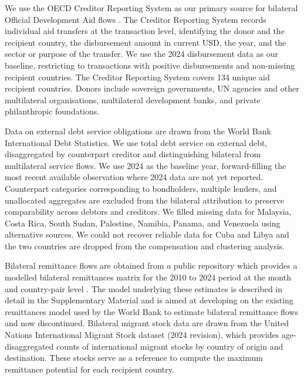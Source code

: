 \documentclass[fleqn,10pt,twocolumn]{wlscirep}
\begin{document}

We use the OECD Creditor Reporting System as our primary source for bilateral Official Development Aid flows \cite{CRS_ODA_2024}. The Creditor Reporting System records individual aid transfers at the transaction level, identifying the donor and the recipient country, the disbursement amount in current USD, the year, and the sector or purpose of the transfer. We use the 2024 disbursement data as our baseline, restricting to transactions with positive disbursements and non-missing recipient countries. The Creditor Reporting System covers 134 unique aid recipient countries. Donors include sovereign governments, UN agencies and other multilateral organisations, multilateral development banks, and private philanthropic foundations. 

Data on external debt service obligations are drawn from the World Bank International Debt Statistics. We use total debt service on external debt, disaggregated by counterpart creditor and distinguishing bilateral from multilateral service flows. We use 2024 as the baseline year, forward-filling the most recent available observation where 2024 data are not yet reported. Counterpart categories corresponding to bondholders, multiple lenders, and unallocated aggregates are excluded from the bilateral attribution to preserve comparability across debtors and creditors. We filled missing data for Malaysia, Costa Rica, South Sudan, Palestine, Namibia, Panama, and Venezuela using alternative sources. We could not recover reliable data for Cuba and Libya and the two countries are dropped from the compensation and clustering analysis.

Bilateral remittance flows are obtained from a public repository which provides a modelled bilateral remittances matrix for the 2010 to 2024 period at the month and country-pair level \cite{vismara2025migrants}. The model underlying these estimates is described in detail in the Supplementary Material and is aimed at developing on the existing remittances model used by the World Bank to estimate bilateral remittance flows \cite{ratha2007south} and now discontinued. Bilateral migrant stock data are drawn from the United Nations International Migrant Stock dataset (2024 revision), which provides age-disaggregated counts of international migrant stocks by country of origin and destination. These stocks serve as a reference to compute the maximum remittance potential for each recipient country.
\end{document}
